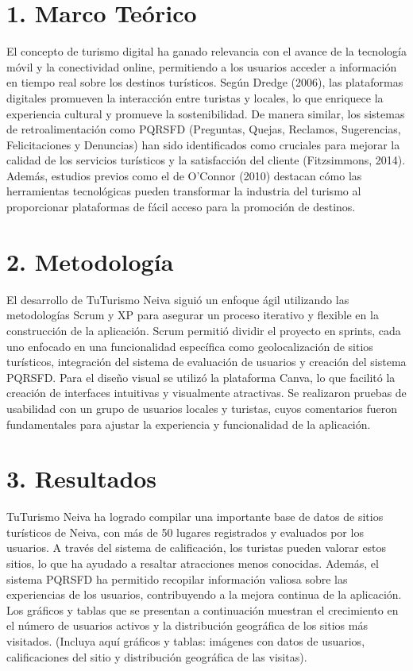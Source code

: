 \documentclass{IEEEoj-data}
\begin{document}
\section*{1. Marco Teórico }

El concepto de turismo digital ha ganado relevancia con el avance de la tecnología móvil y la conectividad online, permitiendo a los usuarios acceder a información en tiempo real sobre los destinos turísticos. Según Dredge (2006), las plataformas digitales promueven la interacción entre turistas y locales, lo que enriquece la experiencia cultural y promueve la sostenibilidad. De manera similar, los sistemas de retroalimentación como PQRSFD (Preguntas, Quejas, Reclamos, Sugerencias, Felicitaciones y Denuncias) han sido identificados como cruciales para mejorar la calidad de los servicios turísticos y la satisfacción del cliente (Fitzsimmons, 2014).  Además, estudios previos como el de O'Connor (2010) destacan cómo las herramientas tecnológicas pueden transformar la industria del turismo al proporcionar plataformas de fácil acceso para la promoción de destinos.

\section*{2. Metodología }

El desarrollo de TuTurismo Neiva siguió un enfoque ágil utilizando las metodologías Scrum y XP para asegurar un proceso iterativo y flexible en la construcción de la aplicación. Scrum permitió dividir el proyecto en sprints, cada uno enfocado en una funcionalidad específica como geolocalización de sitios turísticos, integración del sistema de evaluación de usuarios y creación del sistema PQRSFD. Para el diseño visual se utilizó la plataforma Canva, lo que facilitó la creación de interfaces intuitivas y visualmente atractivas. Se realizaron pruebas de usabilidad con un grupo de usuarios locales y turistas, cuyos comentarios fueron fundamentales para ajustar la experiencia y funcionalidad de la aplicación.

\section*{3. Resultados }

TuTurismo Neiva ha logrado compilar una importante base de datos de sitios turísticos de Neiva, con más de 50 lugares registrados y evaluados por los usuarios. A través del sistema de calificación, los turistas pueden valorar estos sitios, lo que ha ayudado a resaltar atracciones menos conocidas. Además, el sistema PQRSFD ha permitido recopilar información valiosa sobre las experiencias de los usuarios, contribuyendo a la mejora continua de la aplicación. Los gráficos y tablas que se presentan a continuación muestran el crecimiento en el número de usuarios activos y la distribución geográfica de los sitios más visitados. (Incluya aquí gráficos y tablas: imágenes con datos de usuarios, calificaciones del sitio y distribución geográfica de las visitas).
\end{document}

